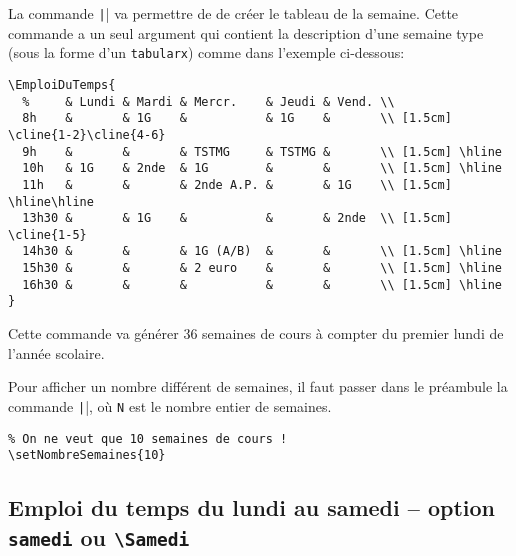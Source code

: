 \documentclass[a4paper,french,10pt]{article}
\begin{document}
La commande \texttt|\EmploiDuTemps| va permettre de de créer le
tableau de la semaine. Cette commande a un seul argument qui contient la
description d'une semaine type (sous la forme d'un \texttt{tabularx}) comme dans
l'exemple ci-dessous:
\begin{verbatim}
\EmploiDuTemps{
  %     & Lundi & Mardi & Mercr.    & Jeudi & Vend. \\
  8h    &       & 1G    &           & 1G    &       \\ [1.5cm] \cline{1-2}\cline{4-6}
  9h    &       &       & TSTMG     & TSTMG &       \\ [1.5cm] \hline
  10h   & 1G    & 2nde  & 1G        &       &       \\ [1.5cm] \hline
  11h   &       &       & 2nde A.P. &       & 1G    \\ [1.5cm] \hline\hline
  13h30 &       & 1G    &           &       & 2nde  \\ [1.5cm] \cline{1-5}
  14h30 &       &       & 1G (A/B)  &       &       \\ [1.5cm] \hline
  15h30 &       &       & 2 euro    &       &       \\ [1.5cm] \hline
  16h30 &       &       &           &       &       \\ [1.5cm] \hline
}
\end{verbatim}
Cette commande va générer 36 semaines de cours à compter du premier lundi de
l'année scolaire.

Pour afficher un nombre différent de semaines, il faut passer dans le préambule
la commande \texttt||, où \texttt{N} est le
nombre entier de semaines.
\begin{verbatim}
% On ne veut que 10 semaines de cours ! 
\setNombreSemaines{10}
\end{verbatim}

\subsection{Emploi du temps du lundi au samedi -- 
  option \texttt{samedi} ou \texttt{\textbackslash{}Samedi}}
\end{document}
